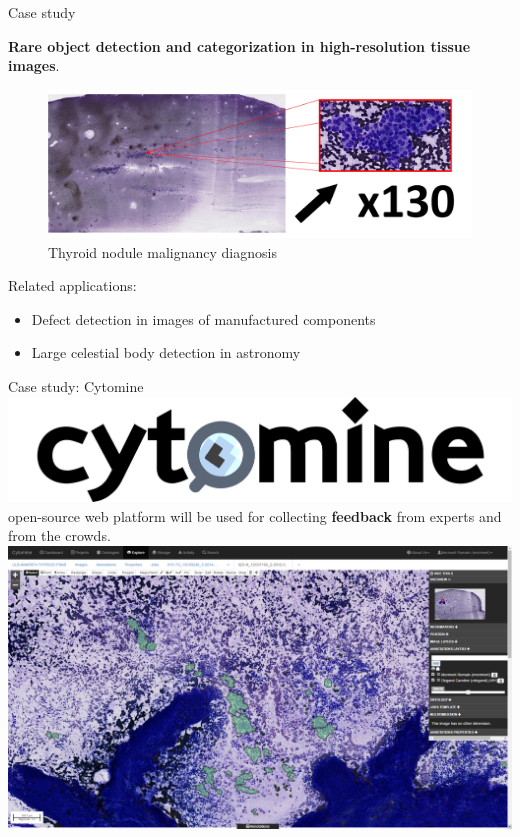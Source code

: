 \documentclass{beamer}
\begin{document}
\begin{frame}{Case study}
	\begin{center}
		\textbf{Rare object detection and categorization in high-resolution tissue images}.
	\end{center}
		
	\begin{figure}[h]
		\center
		\includegraphics[scale=0.125]{images/whole-slide-dim.png}
		\caption{Thyroid nodule malignancy diagnosis}
	\end{figure}
	
	\vfill
	
	Related applications:
	\begin{itemize}
		\item Defect detection in images of manufactured components 
		\item Large celestial body detection in astronomy
	\end{itemize}
	
\end{frame}

\begin{frame}{Case study: Cytomine}
	\includegraphics[scale=0.07]{images/cytomine_typo.png} \text{ } open-source web platform will be used for collecting \textbf{feedback} from experts and from the crowds. \\  
	\vspace*{0.25cm}
	\hspace*{-0.75in}\includegraphics[scale=0.22]{images/cytomine.png}
\end{frame}
\end{document}
